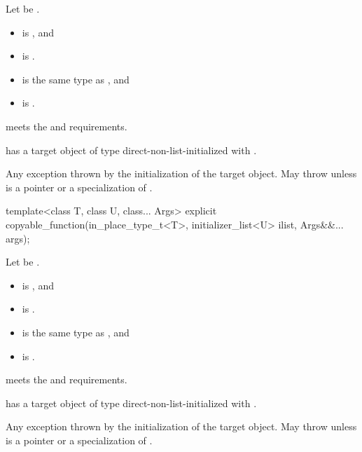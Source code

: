 \begin{itemdescr}
\pnum
Let  be .

\pnum
\constraints
\begin{itemize}
\item
{} is , and
\item
{} is .
\end{itemize}

\pnum
\mandates
\begin{itemize}
\item
{} is the same type as , and
\item
{} is .
\end{itemize}

\pnum
\expects
{} meets the  and
 requirements.

\pnum
\ensures
{} has a target object of type 
direct-non-list-initialized with .

\pnum
\throws
Any exception thrown by the initialization of the target object.
May throw  unless  is
a pointer or a specialization of .
\end{itemdescr}

%
\begin{itemdecl}
template<class T, class U, class... Args>
  explicit copyable_function(in_place_type_t<T>, initializer_list<U> ilist, Args&&... args);
\end{itemdecl}

\begin{itemdescr}
\pnum
Let  be .

\pnum
\constraints
\begin{itemize}
\item
{} is
, and
\item
{} is .
\end{itemize}

\pnum
\mandates
\begin{itemize}
\item
{} is the same type as , and
\item
{} is .
\end{itemize}

\pnum
\expects
{} meets the  and
 requirements.

\pnum
\ensures
{} has a target object of type 
direct-non-list-initialized with
.

\pnum
\throws
Any exception thrown by the initialization of the target object.
May throw  unless  is
a pointer or a specialization of .
\end{itemdescr}


